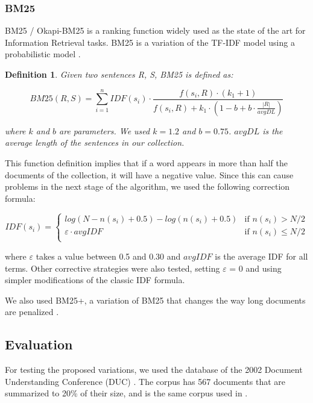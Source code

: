 \documentclass{llncs}
\newtheorem{definicion}{Definition}
\begin{document}
\subsubsection{BM25}
BM25 / Okapi-BM25 is a ranking function widely used as the state of the art for Information Retrieval tasks. BM25 is a variation of the TF-IDF model using a probabilistic model \cite{robertson}.

\begin{definicion}
Given two sentences R, S, BM25 is defined as:

\begin{equation}
BM25(R,S) = \sum_{i=1}^{n} IDF(s_i) \cdot \frac{f(s_i, R) \cdot (k_1 + 1)}{f(s_i, R) + k_1 \cdot (1 - b + b \cdot \frac{|R|}{avgDL})}
\end{equation}

where $k$ and $b$ are parameters. We used $k = 1.2$ and $b = 0.75$. $avgDL$ is the average length of the sentences in our collection.
\end{definicion}

This function definition implies that if a word appears in more than half the documents of the collection, it will have a negative value. Since this can cause problems in the next stage of the algorithm, we used the following correction formula:
                
\begin{equation}
 IDF(s_i) =
  \begin{cases}
       log(N - n(s_i) + 0.5) - log(n(s_i) + 0.5)    & \text{if }  n(s_i) > N/2\\
       \varepsilon \cdot avgIDF                     & \text{if }  n(s_i) \leq N/2\\
  \end{cases}
\end{equation}                
                
where $\varepsilon$ takes a value between 0.5 and 0.30 and $avgIDF$ is the average IDF for all terms.
Other corrective strategies were also tested, setting $\varepsilon$ = 0 and using simpler modifications of the classic IDF formula.

We also used BM25+, a variation of BM25 that changes the way long documents are penalized \cite{lv}.


\subsection{Evaluation}
For testing the proposed variations, we used the database of the 2002 Document Understanding Conference (DUC) \cite{duc2002-guidelines}. The corpus has 567 documents that are summarized to 20\% of their size, and is the same corpus used in \cite{mihalcea-tarau}. 
\end{document}
